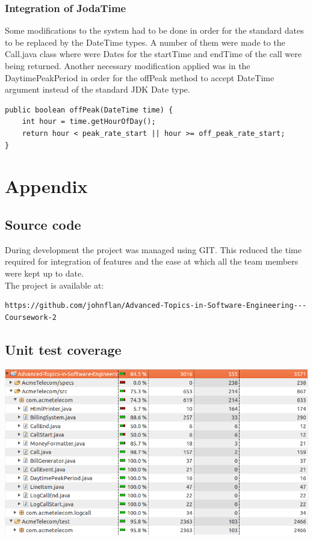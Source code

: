 \documentclass[pdftex,11pt,a4paper]{article}
\begin{document}
\subsubsection{Integration of JodaTime}
Some modifications to the system had to be done in order for the standard dates to be replaced by the DateTime types. A number of them were made to the Call.java class where were Dates for the startTime and endTime of the call were being returned. Another necessary modification applied was in the DaytimePeakPeriod in order for the offPeak method to accept DateTime argument instead of the standard JDK Date type.
\begin{lstlisting}
public boolean offPeak(DateTime time) {     
	int hour = time.getHourOfDay();
	return hour < peak_rate_start || hour >= off_peak_rate_start;
}
\end{lstlisting}
\newpage
\section{Appendix}

\subsection{Source code}
During development the project was managed using GIT. This reduced the time required for integration of features and the ease at which all the team members were kept up to date.\\
The project is available at:
\begin{lstlisting}
https://github.com/johnflan/Advanced-Topics-in-Software-Engineering---Coursework-2
\end{lstlisting}

\subsection{Unit test coverage}
\begin{center}
	\includegraphics[scale=0.55]{images/emma_code_coverage_.png}
\end{center}
\end{document}
